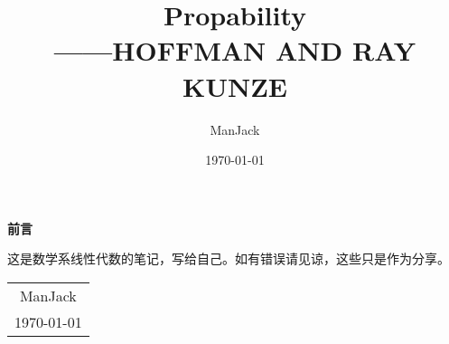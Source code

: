 \documentclass[11pt, a4paper, oneside, UTF8]{ctexbook}
\title{{\Huge{\textbf{Propability}}}\\------HOFFMAN AND RAY KUNZE}
\author{ManJack}
\date{\today}
\newtheorem[M]{theorem}{Theorem}[section]
\newtheorem[M]{lemma}[theorem]{Lemma}
\newtheorem[M]{definition}{Definition}[section]
\newtheorem[M]{corollary}[theorem]{Corollary}
\newtheorem[M]{proposition}[theorem]{Proposition}
\newtheorem[M]{property}[theorem]{Property}
\begin{document}
\maketitle

\setcounter{page}{1}

\newpage
\begin{center}
  \Huge\textbf{前言}
\end{center}

这是数学系线性代数的笔记，写给自己。如有错误请见谅，这些只是作为分享。

\begin{flushright}
  \begin{tabular}{c}
    ManJack \\
    \today
  \end{tabular}
\end{flushright}

\newpage
\tableofcontents
\newpage
{}
\setcounter{page}{1}




\end{document}
